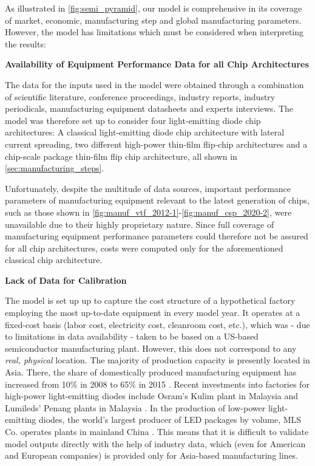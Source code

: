 \documentclass[parskip=full]{article}
\begin{document}
\clearpage

As illustrated in \cref{fig:semi_pyramid}, our model is comprehensive in its coverage of market, economic, manufacturing step and global manufacturing parameters. However, the model has limitations which must be considered when interpreting the results:

\textbf{Availability of Equipment Performance Data for all Chip Architectures}

The data for the inputs used in the model were obtained through a combination of scientific literature, conference proceedings, industry reports, industry periodicals, manufacturing equipment datasheets and experts interviews. The model was therefore set up to consider four light-emitting diode chip architectures: A classical light-emitting diode chip architecture with lateral current spreading, two diﬀerent high-power thin-ﬁlm ﬂip-chip architectures and a chip-scale package thin-ﬁlm ﬂip chip architecture, all shown in \cref{sec:manufacturing_steps}.

Unfortunately, despite the multitude of data sources, important performance parameters of  manufacturing equipment relevant to the latest generation of chips, such as those shown in \cref{fig:manuf_vtf_2012-1}-\cref{fig:manuf_csp_2020-2}, were unavailable due to their highly proprietary nature. Since full coverage of manufacturing equipment performance parameters could therefore not be assured for all chip architectures, costs were computed only for the aforementioned classical chip architecture.

\textbf{Lack of Data for Calibration}

The model is set up up to capture the cost structure of a hypothetical factory employing the most up-to-date equipment in every model year. It operates at a fixed-cost basis (labor cost, electricity cost, cleanroom cost, etc.), which was - due to limitations in data availability - taken to be based on a US-based semiconductor manufacturing plant. However, this does not correspond to any \textit{real, physical} location. The majority of production capacity is presently located in Asia. There, the share of domestically produced manufacturing equipment has increased from 10\% in 2008 to 65\% in 2015 \cite{tseng2015fab}. Recent investments into factories for high-power light-emitting diodes include Osram's Kulim plant in Malaysia \cite{osram2020kulim} and Lumileds' Penang plants in Malaysia \cite{lumileds2020penang}. In the production of low-power light-emitting diodes, the world's largest producer of LED packages by volume, MLS Co. operates plants in mainland China \cite{mls2020dev}. This means that it is difficult to validate model outputs directly with the help of industry data, which (even for American and European companies) is provided only for Asia-based manufacturing lines. 
\end{document}
